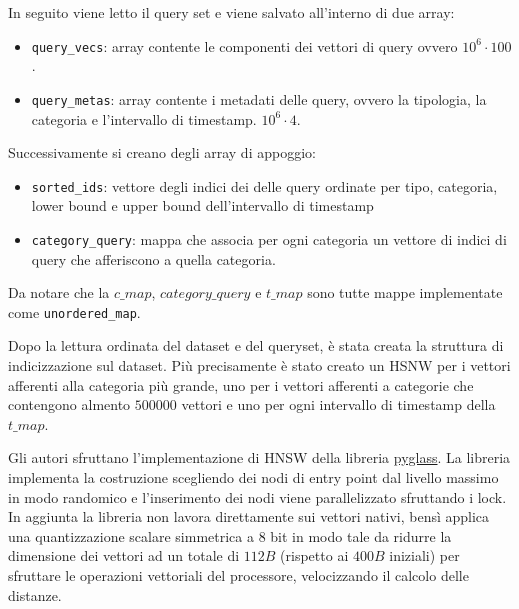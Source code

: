 In seguito viene letto il query set e viene salvato all'interno di due array:
\begin{itemize}
    \item \texttt{query\_vecs}: array contente le componenti dei vettori di query ovvero 
    $10^6 \cdot 100$.
    \item \texttt{query\_metas}: array contente i metadati delle query, ovvero la tipologia,
    la categoria e l'intervallo di timestamp.
    $10^6 \cdot 4$.
\end{itemize}

Successivamente si creano degli array di appoggio:
\begin{itemize}
    \item \texttt{sorted\_ids}: vettore degli indici dei delle query ordinate per tipo, 
    categoria, lower bound e upper bound dell'intervallo di timestamp
    \item \texttt{category\_query}: mappa che associa per ogni categoria un vettore di 
    indici di query che afferiscono a quella categoria.
\end{itemize}

Da notare che la $c\_map$, $category\_query$ e $t\_map$ sono tutte mappe implementate 
come \texttt{unordered\_map}.

Dopo la lettura ordinata del dataset e del queryset, è stata creata la struttura 
di indicizzazione sul dataset. Più precisamente è stato creato un HSNW per i vettori 
afferenti alla categoria più grande, uno per i vettori afferenti a categorie che 
contengono almento $500000$ vettori e uno per ogni intervallo di timestamp della 
$t\_map$. 

Gli autori sfruttano l'implementazione di HNSW della libreria 
\href{https://github.com/zilliztech/pyglass/tree/master}{pyglass}. 
La libreria implementa la costruzione scegliendo dei nodi di entry point dal livello 
massimo in modo randomico e l'inserimento dei nodi viene parallelizzato sfruttando 
i lock. In aggiunta la libreria non lavora direttamente sui vettori nativi, bensì
applica una quantizzazione scalare simmetrica a $8$ bit in modo tale da ridurre la dimensione 
dei vettori ad un totale di $112 B$ (rispetto ai $400 B$ iniziali) per sfruttare le operazioni vettoriali 
del processore, velocizzando il calcolo delle distanze.

